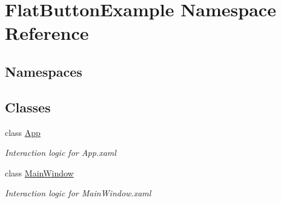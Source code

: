 \hypertarget{namespace_flat_button_example}{}\section{Flat\+Button\+Example Namespace Reference}
\label{namespace_flat_button_example}
\subsection*{Namespaces}
\begin{DoxyCompactItemize}
\end{DoxyCompactItemize}
\subsection*{Classes}
\begin{DoxyCompactItemize}
\item 
class \mbox{\hyperlink{class_flat_button_example_1_1_app}{App}}
\begin{DoxyCompactList}\small\item\em Interaction logic for App.\+xaml \end{DoxyCompactList}\item 
class \mbox{\hyperlink{class_flat_button_example_1_1_main_window}{Main\+Window}}
\begin{DoxyCompactList}\small\item\em Interaction logic for Main\+Window.\+xaml \end{DoxyCompactList}\end{DoxyCompactItemize}
